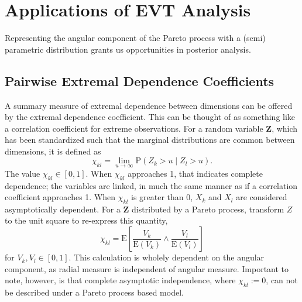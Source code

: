 \section{Applications of EVT Analysis}
\label{ref:applications}
Representing the angular component of the Pareto process with a (semi) parametric distribution grants
  us opportunities in posterior analysis.
%

\subsection{Pairwise Extremal Dependence Coefficients}
A summary measure of extremal dependence between dimensions can be offered by the extremal dependence
  coefficient.  This can be thought of as something like a correlation coefficient for extreme
  observations.  For a random variable $\bm{Z}$, which has been standardized such that the marginal
  distributions are common between dimensions, it is defined as
  \begin{equation}
    \chi_{kl} = \lim\limits_{u\to\infty}\text{P}\left(Z_k > u\mid Z_l > u\right).
  \end{equation}
  The value $\chi_{kl} \in [0,1]$.  When $\chi_{kl}$ approaches 1, that indicates complete dependence;
  the variables are linked, in much the same manner as if a correlation coefficient approaches 1.
  When $\chi_{kl}$ is greater than 0, $X_k$ and $X_l$ are considered asymptotically dependent.  For
  a $\bm{Z}$ distributed by a Pareto process, \cite{warner2018} transform $Z$ to the unit square to
  re-express this quantity,
  \begin{equation}
    \label{eqn:extdepcoef}
    \chi_{kl} = \text{E}\left[\frac{V_k}{\text{E}(V_k)}\wedge\frac{V_l}{\text{E}(V_l)}\right]
  \end{equation}
  for $V_k,V_l \in [0,1]$.  This calculation is wholely dependent on the angular component, as radial
  measure is independent of angular measure.  Important to note, however, is that complete asymptotic
  independence, where $\chi_{kl} := 0$, can not be described under a Pareto process based model.

